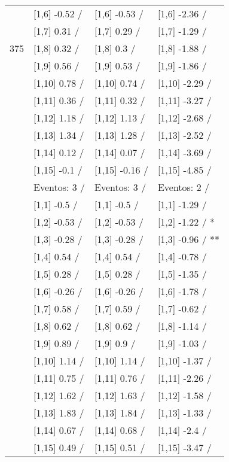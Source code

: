 \begin{table}
\begin{tabular}[t]{llll}
 & {}[1,6] -0.52  / & {}[1,6] -0.53  / & {}[1,6] -2.36  /\\
 & {}[1,7] 0.31  / & {}[1,7] 0.29  / & {}[1,7] -1.29  /\\
375 & {}[1,8] 0.32  / & {}[1,8] 0.3  / & {}[1,8] -1.88  /\\
\addlinespace
 & {}[1,9] 0.56  / & {}[1,9] 0.53  / & {}[1,9] -1.86  /\\
 & {}[1,10] 0.78  / & {}[1,10] 0.74  / & {}[1,10] -2.29  /\\
 & {}[1,11] 0.36  / & {}[1,11] 0.32  / & {}[1,11] -3.27  /\\
 & {}[1,12] 1.18  / & {}[1,12] 1.13  / & {}[1,12] -2.68  /\\
 & {}[1,13] 1.34  / & {}[1,13] 1.28  / & {}[1,13] -2.52  /\\
\addlinespace
 & {}[1,14] 0.12  / & {}[1,14] 0.07  / & {}[1,14] -3.69  /\\
 & {}[1,15] -0.1  / & {}[1,15] -0.16  / & {}[1,15] -4.85  /\\
 & Eventos:  3 / & Eventos:  3 / & Eventos:  2 /\\
 & {}[1,1] -0.5  / & {}[1,1] -0.5  / & {}[1,1] -1.29  /\\
 & {}[1,2] -0.53  / & {}[1,2] -0.53  / & {}[1,2] -1.22  / *\\
\addlinespace
 & {}[1,3] -0.28  / & {}[1,3] -0.28  / & {}[1,3] -0.96  / **\\
 & {}[1,4] 0.54  / & {}[1,4] 0.54  / & {}[1,4] -0.78  /\\
 & {}[1,5] 0.28  / & {}[1,5] 0.28  / & {}[1,5] -1.35  /\\
 & {}[1,6] -0.26  / & {}[1,6] -0.26  / & {}[1,6] -1.78  /\\
 & {}[1,7] 0.58  / & {}[1,7] 0.59  / & {}[1,7] -0.62  /\\
\addlinespace
500 & {}[1,8] 0.62  / & {}[1,8] 0.62  / & {}[1,8] -1.14  /\\
 & {}[1,9] 0.89  / & {}[1,9] 0.9  / & {}[1,9] -1.03  /\\
 & {}[1,10] 1.14  / & {}[1,10] 1.14  / & {}[1,10] -1.37  /\\
 & {}[1,11] 0.75  / & {}[1,11] 0.76  / & {}[1,11] -2.26  /\\
 & {}[1,12] 1.62  / & {}[1,12] 1.63  / & {}[1,12] -1.58  /\\
\addlinespace
 & {}[1,13] 1.83  / & {}[1,13] 1.84  / & {}[1,13] -1.33  /\\
 & {}[1,14] 0.67  / & {}[1,14] 0.68  / & {}[1,14] -2.4  /\\
 & {}[1,15] 0.49  / & {}[1,15] 0.51  / & {}[1,15] -3.47  /\\
\bottomrule
\end{tabular}
\end{table}
